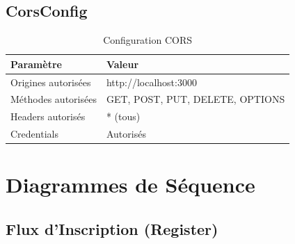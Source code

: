 \documentclass[12pt,a4paper]{report}
\begin{document}
\section{CorsConfig}

\begin{table}[H]
\centering
\begin{tabular}{|l|l|}
\hline
\textbf{Paramètre} & \textbf{Valeur} \\ \hline
Origines autorisées & http://localhost:3000 \\ \hline
Méthodes autorisées & GET, POST, PUT, DELETE, OPTIONS \\ \hline
Headers autorisés & * (tous) \\ \hline
Credentials & Autorisés \\ \hline
\end{tabular}
\caption{Configuration CORS}
\end{table}

\chapter{Diagrammes de Séquence}

\section{Flux d'Inscription (Register)}
\end{document}
